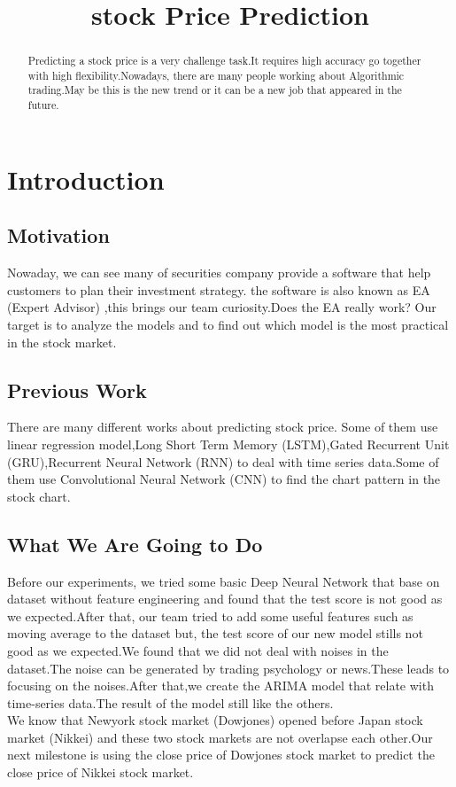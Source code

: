 \documentclass{article}
\title{stock Price Prediction}
\begin{document}
%
\maketitle
%
\begin{abstract}
Predicting a stock price is a very challenge task.It requires high accuracy go together with high flexibility.Nowadays, there are many people working about Algorithmic trading.May be this is the new trend or it can be a new job that appeared in the future. 
\end{abstract}

\section{Introduction}\label{sec:intro}

\subsection{Motivation}

Nowaday, we can see many of securities company provide a software that help customers to plan their investment strategy.
the software is also known as EA (Expert Advisor) ,this brings our team curiosity.Does the EA really work? Our target is to analyze the models and to find out which model is the most practical in the stock market.

\subsection{Previous Work}
There are many different works about predicting stock price. Some of them use linear regression model,Long Short Term Memory (LSTM),Gated Recurrent Unit (GRU),Recurrent Neural Network (RNN) to deal with time series data.Some of them use Convolutional Neural Network (CNN) to find the chart pattern in the stock chart.

\subsection{What We Are Going to Do}

Before our experiments, we tried some basic Deep Neural Network that base on dataset without feature engineering and found that the test score is not good as we expected.After that, our team tried to add some useful features such as moving average to the dataset but, the test score of our new model stills not good as we expected.We found that we did not deal with noises in the dataset.The noise can be generated by trading psychology or news.These leads to focusing on the noises.After that,we create the ARIMA model that relate with time-series data.The result of the model still like the others.\\We know that Newyork stock market (Dowjones) opened before Japan stock market (Nikkei) and these two stock markets are not overlapse each other.Our next milestone is using the close price of Dowjones stock market to predict the close price of Nikkei stock market.
\end{document}
